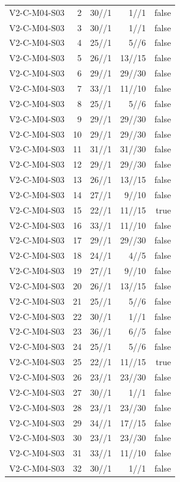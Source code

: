 {\begin{longtable}{lrrrr}
V2-C-M04-S03 & 2 & 30//1 & 1//1 & false \\
V2-C-M04-S03 & 3 & 30//1 & 1//1 & false \\
V2-C-M04-S03 & 4 & 25//1 & 5//6 & false \\
V2-C-M04-S03 & 5 & 26//1 & 13//15 & false \\
V2-C-M04-S03 & 6 & 29//1 & 29//30 & false \\
V2-C-M04-S03 & 7 & 33//1 & 11//10 & false \\
V2-C-M04-S03 & 8 & 25//1 & 5//6 & false \\
V2-C-M04-S03 & 9 & 29//1 & 29//30 & false \\
V2-C-M04-S03 & 10 & 29//1 & 29//30 & false \\
V2-C-M04-S03 & 11 & 31//1 & 31//30 & false \\
V2-C-M04-S03 & 12 & 29//1 & 29//30 & false \\
V2-C-M04-S03 & 13 & 26//1 & 13//15 & false \\
V2-C-M04-S03 & 14 & 27//1 & 9//10 & false \\
V2-C-M04-S03 & 15 & 22//1 & 11//15 & true \\
V2-C-M04-S03 & 16 & 33//1 & 11//10 & false \\
V2-C-M04-S03 & 17 & 29//1 & 29//30 & false \\
V2-C-M04-S03 & 18 & 24//1 & 4//5 & false \\
V2-C-M04-S03 & 19 & 27//1 & 9//10 & false \\
V2-C-M04-S03 & 20 & 26//1 & 13//15 & false \\
V2-C-M04-S03 & 21 & 25//1 & 5//6 & false \\
V2-C-M04-S03 & 22 & 30//1 & 1//1 & false \\
V2-C-M04-S03 & 23 & 36//1 & 6//5 & false \\
V2-C-M04-S03 & 24 & 25//1 & 5//6 & false \\
V2-C-M04-S03 & 25 & 22//1 & 11//15 & true \\
V2-C-M04-S03 & 26 & 23//1 & 23//30 & false \\
V2-C-M04-S03 & 27 & 30//1 & 1//1 & false \\
V2-C-M04-S03 & 28 & 23//1 & 23//30 & false \\
V2-C-M04-S03 & 29 & 34//1 & 17//15 & false \\
V2-C-M04-S03 & 30 & 23//1 & 23//30 & false \\
V2-C-M04-S03 & 31 & 33//1 & 11//10 & false \\
V2-C-M04-S03 & 32 & 30//1 & 1//1 & false \\

\end{longtable}}
